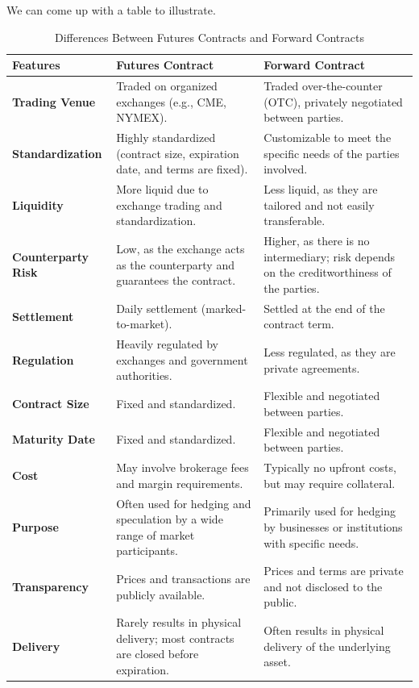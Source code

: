 \documentclass[margin=1in]{article}
\begin{document}
		  We can come up with a table to illustrate.
		  
		  \begin{table}[h!]
		  	\caption{Differences Between Futures Contracts and Forward Contracts}
		  	\centering
		  	\small %
		  	\setlength{\tabcolsep}{4pt} %
		  	\begin{tabular}{|p{}|p{}|p{}|}
		  		\hline
		  		\textbf{Features} & \textbf{Futures Contract} & \textbf{Forward Contract} \\ \hline
		  		\textbf{Trading Venue} & Traded on organized exchanges (e.g., CME, NYMEX). & Traded over-the-counter (OTC), privately negotiated between parties. \\ \hline
		  		\textbf{Standardization} & Highly standardized (contract size, expiration date, and terms are fixed). & Customizable to meet the specific needs of the parties involved. \\ \hline
		  		\textbf{Liquidity} & More liquid due to exchange trading and standardization. & Less liquid, as they are tailored and not easily transferable. \\ \hline
		  		\textbf{Counterparty Risk} & Low, as the exchange acts as the counterparty and guarantees the contract. & Higher, as there is no intermediary; risk depends on the creditworthiness of the parties. \\ \hline
		  		\textbf{Settlement} & Daily settlement (marked-to-market). & Settled at the end of the contract term. \\ \hline
		  		\textbf{Regulation} & Heavily regulated by exchanges and government authorities. & Less regulated, as they are private agreements. \\ \hline
		  		\textbf{Contract Size} & Fixed and standardized. & Flexible and negotiated between parties. \\ \hline
		  		\textbf{Maturity Date} & Fixed and standardized. & Flexible and negotiated between parties. \\ \hline
		  		\textbf{Cost} & May involve brokerage fees and margin requirements. & Typically no upfront costs, but may require collateral. \\ \hline
		  		\textbf{Purpose} & Often used for hedging and speculation by a wide range of market participants. & Primarily used for hedging by businesses or institutions with specific needs. \\ \hline
		  		\textbf{Transparency} & Prices and transactions are publicly available. & Prices and terms are private and not disclosed to the public. \\ \hline
		  		\textbf{Delivery} & Rarely results in physical delivery; most contracts are closed before expiration. & Often results in physical delivery of the underlying asset. \\ \hline
		  	\end{tabular}
		  	
		  	\label{tab:futures_vs_forwards}
		  \end{table}
		  \pagebreak
		  
\end{document}
